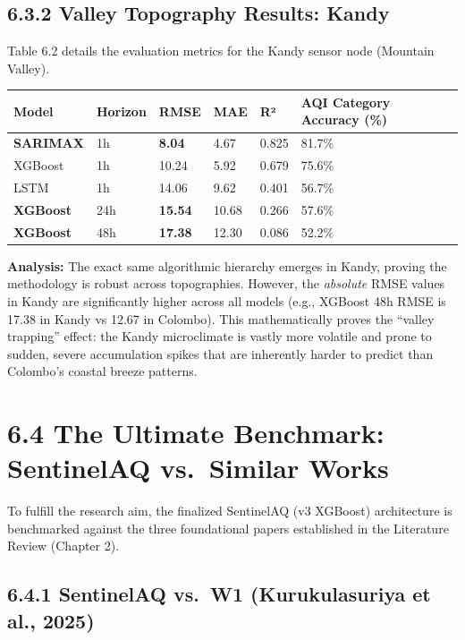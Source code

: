 \subsection{6.3.2 Valley Topography Results:
Kandy}\label{valley-topography-results-kandy}

Table 6.2 details the evaluation metrics for the Kandy sensor node
(Mountain Valley).

{\def\LTcaptype{none} %
\begin{longtable}[]{@{}llllll@{}}
\toprule\noalign{}
Model & Horizon & RMSE & MAE & R² & AQI Category Accuracy (\%) \\
\midrule\noalign{}
\endhead
\bottomrule\noalign{}
\endlastfoot
\textbf{SARIMAX} & 1h & \textbf{8.04} & 4.67 & 0.825 & 81.7\% \\
XGBoost & 1h & 10.24 & 5.92 & 0.679 & 75.6\% \\
LSTM & 1h & 14.06 & 9.62 & 0.401 & 56.7\% \\
\textbf{XGBoost} & 24h & \textbf{15.54} & 10.68 & 0.266 & 57.6\% \\
\textbf{XGBoost} & 48h & \textbf{17.38} & 12.30 & 0.086 & 52.2\% \\
\end{longtable}
}

\textbf{Analysis:} The exact same algorithmic hierarchy emerges in
Kandy, proving the methodology is robust across topographies. However,
the \emph{absolute} RMSE values in Kandy are significantly higher across
all models (e.g., XGBoost 48h RMSE is 17.38 in Kandy vs 12.67 in
Colombo). This mathematically proves the ``valley trapping'' effect: the
Kandy microclimate is vastly more volatile and prone to sudden, severe
accumulation spikes that are inherently harder to predict than Colombo's
coastal breeze patterns.

\section{6.4 The Ultimate Benchmark: SentinelAQ vs.~Similar
Works}\label{the-ultimate-benchmark-sentinelaq-vs.-similar-works}

To fulfill the research aim, the finalized SentinelAQ (v3 XGBoost)
architecture is benchmarked against the three foundational papers
established in the Literature Review (Chapter 2).

\subsection{6.4.1 SentinelAQ vs.~W1 (Kurukulasuriya et al.,
2025)}\label{sentinelaq-vs.-w1-kurukulasuriya-et-al.-2025}

